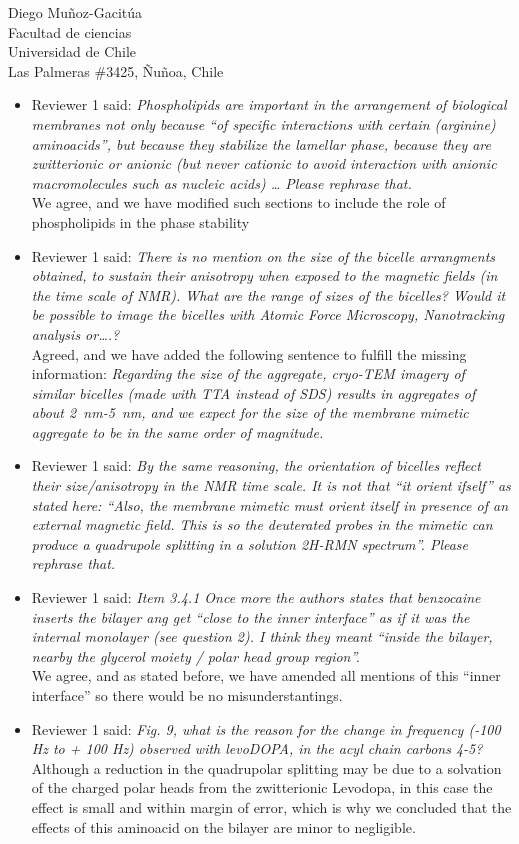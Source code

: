 \documentclass{letter}
\begin{document}
\begin{letter}{Diego Muñoz-Gacitúa\\ Facultad de ciencias \\ Universidad de
    Chile \\ Las Palmeras \#3425, Ñuñoa, Chile}
\begin{itemize}
  \item Reviewer 1 said: \textit{Phospholipids are important in the arrangement of biological membranes not only because “of specific interactions with certain (arginine) aminoacids”, but because they stabilize the lamellar phase, because they are zwitterionic or anionic (but never cationic to avoid interaction with anionic macromolecules such as nucleic acids) … Please rephrase that.}\\
  We agree, and we have modified such sections to include the role of
  phospholipids in the phase stability\
 
\item Reviewer 1 said: \textit{There is no mention on the size of the bicelle arrangments obtained, to sustain their anisotropy when exposed to the magnetic fields (in the time scale of NMR). What are the range of sizes of the bicelles? Would it be possible to image the bicelles with Atomic Force Microscopy, Nanotracking analysis or….?}\\
  Agreed, and we have added the following sentence to fulfill the missing
  information: \textit{Regarding the size of the aggregate, cryo-TEM imagery of similar
  bicelles (made with TTA instead of SDS)
  results in aggregates of about
  \SI{2}{nm}-\SI{5}{nm}, and we expect for the size of
  the membrane mimetic aggregate to be in the same order of magnitude.}

\item Reviewer 1 said: \textit{By the same reasoning, the orientation of
    bicelles reflect their size/anisotropy in the NMR time scale. It is not
    that ``it orient ifself'' as stated here: “Also, the membrane mimetic
    must orient itself in presence of an external magnetic field. This is so the
  deuterated probes in the mimetic can produce a quadrupole splitting in a
  solution 2H-RMN spectrum”. Please rephrase that.}

\item Reviewer 1 said: \textit{Item 3.4.1 Once more the authors states that
    benzocaine inserts the bilayer ang get ``close to the inner interface'' as if
    it was the internal monolayer (see question 2). I think they meant ``inside the
    bilayer, nearby the glycerol moiety / polar head group region''. }\\
  We agree, and as stated before, we have amended all mentions of this ``inner
  interface'' so there would be no misunderstantings.
  
\item Reviewer 1 said: \textit{Fig. 9, what is the reason for the change in
    frequency (-100 Hz to + 100 Hz) observed with levoDOPA, in the acyl chain
    carbons 4-5?}\\
	Although a reduction in the quadrupolar splitting may be due to a solvation of the charged polar heads from the zwitterionic Levodopa, in this case the effect is small and within margin of error, which is why we concluded that the effects of this aminoacid on the bilayer are minor to negligible.


\end{itemize}
\end{letter}
\end{document}

